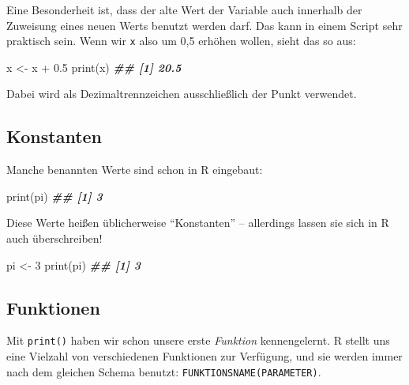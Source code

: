\documentclass[11pt,german,a4paper]{article}
\newenvironment{Shaded}{\begin{snugshade}}{\end{snugshade}}
\newcommand{\DecValTok}[1]{\textcolor[rgb]{0.00,0.00,0.81}{#1}}
\newcommand{\DocumentationTok}[1]{\textcolor[rgb]{0.56,0.35,0.01}{\textbf{\textit{#1}}}}
\newcommand{\FloatTok}[1]{\textcolor[rgb]{0.00,0.00,0.81}{#1}}
\newcommand{\FunctionTok}[1]{\textcolor[rgb]{0.00,0.00,0.00}{#1}}
\newcommand{\NormalTok}[1]{#1}
\newcommand{\OtherTok}[1]{\textcolor[rgb]{0.56,0.35,0.01}{#1}}
\newcommand{\SpecialCharTok}[1]{\textcolor[rgb]{0.00,0.00,0.00}{#1}}
\begin{document}
Eine Besonderheit ist, dass der alte Wert der Variable auch innerhalb der Zuweisung eines neuen Werts benutzt werden darf. Das kann in einem Script sehr praktisch sein. Wenn wir \texttt{x} also um 0,5 erhöhen wollen, sieht das so aus:

\begin{Shaded}
\begin{Highlighting}[]
\NormalTok{x }\OtherTok{\textless{}{-}}\NormalTok{ x }\SpecialCharTok{+} \FloatTok{0.5}
\FunctionTok{print}\NormalTok{(x)}
\DocumentationTok{\#\# [1] 20.5}
\end{Highlighting}
\end{Shaded}

Dabei wird als Dezimaltrennzeichen ausschließlich der Punkt verwendet.

\hypertarget{konstanten}{%
\subsection*{Konstanten}\label{konstanten}}

Manche benannten Werte sind schon in R eingebaut:

\begin{Shaded}
\begin{Highlighting}[]
\FunctionTok{print}\NormalTok{(pi)}
\DocumentationTok{\#\# [1] 3}
\end{Highlighting}
\end{Shaded}

Diese Werte heißen üblicherweise ``Konstanten'' -- allerdings lassen sie sich in R auch überschreiben!

\begin{Shaded}
\begin{Highlighting}[]
\NormalTok{pi }\OtherTok{\textless{}{-}} \DecValTok{3}
\FunctionTok{print}\NormalTok{(pi)}
\DocumentationTok{\#\# [1] 3}
\end{Highlighting}
\end{Shaded}

\hypertarget{funktionen}{%
\subsection*{Funktionen}\label{funktionen}}

Mit \texttt{print()} haben wir schon unsere erste \emph{Funktion} kennengelernt. R stellt uns eine Vielzahl von verschiedenen Funktionen zur Verfügung, und sie werden immer nach dem gleichen Schema benutzt: \texttt{FUNKTIONSNAME(PARAMETER)}.
\end{document}
